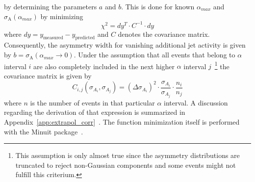 by determining the parameters $a$ and $b$. This is done for known $\alpha_{max}$ and $\sigma_\mathrm{A}(\alpha_{max})$ by minimizing 
\begin{equation}
\chi^2 = dy^T \cdot C^{-1} \cdot dy
\end{equation}
where $dy = y_{\mathrm{measured}} - y_{\mathrm{predicted}}$ and $C$ denotes the covariance matrix. Consequently, the asymmetry width for vanishing additional jet activity is given by $b=\sigma_\mathrm{A}(\alpha_{max} \rightarrow 0)$. Under the assumption that all events that belong to $\alpha$ interval $i$ are also completely included in the next higher $\alpha$ interval $j$~\footnote{This assumption is only almost true since the asymmetry distributions are truncated to reject non-Gaussian components and some events might not fulfill this criterium.} the covariance matrix is given by
\begin{equation}
C_{i,j}(\sigma_{A_i},\sigma_{A_j}) = (\Delta \sigma_{A_i})^2 \cdot \frac{\sigma_{A_i}}{\sigma_{A_j}} \cdot \frac{n_i}{n_j} 
\label{eq:jer_corr}
\end{equation}
where $n$ is the number of events in that particular $\alpha$ interval. A discussion regarding the derivation of that expression is summarized in Appendix~\ref{app:extrapol_corr}~\cite{JOtt}. The function minimization itself is performed with the Minuit package~\cite{Minuit}.   

